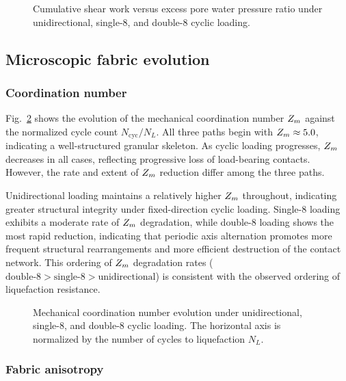 \begin{figure}
  \centering
  \caption{Cumulative shear work versus excess pore water pressure ratio
    under unidirectional, single-8, and double-8 cyclic loading.}
  \label{fig:cumulative_work}
\end{figure}


\subsection{Microscopic fabric evolution}
\label{subsec:micro_fabric}

\subsubsection{Coordination number}

Fig.~\ref{fig:zm_evolution} shows the evolution of the mechanical coordination number $Z_m$ against the normalized cycle count $N_{\mathrm{cyc}}/N_L$. All three paths begin with $Z_m \approx 5.0$, indicating a well-structured granular skeleton. As cyclic loading progresses, $Z_m$ decreases in all cases, reflecting progressive loss of load-bearing contacts. However, the rate and extent of $Z_m$ reduction differ among the three paths.

Unidirectional loading maintains a relatively higher $Z_m$ throughout, indicating greater structural integrity under fixed-direction cyclic loading. Single-8 loading exhibits a moderate rate of $Z_m$ degradation, while double-8 loading shows the most rapid reduction, indicating that periodic axis alternation promotes more frequent structural rearrangements and more efficient destruction of the contact network. This ordering of $Z_m$ degradation rates ($\text{double-8} > \text{single-8} > \text{unidirectional}$) is consistent with the observed ordering of liquefaction resistance.

\begin{figure}
  \centering
  \caption{Mechanical coordination number evolution under unidirectional,
    single-8, and double-8 cyclic loading. The horizontal axis is normalized
    by the number of cycles to liquefaction $N_L$.}
  \label{fig:zm_evolution}
\end{figure}

\subsubsection{Fabric anisotropy}

